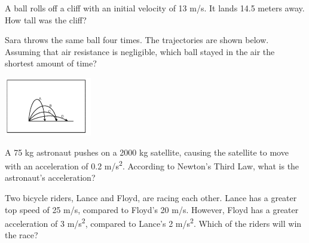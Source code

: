 \documentclass[10pt]{examdesign}
\begin{document}
\begin{multiplechoice} [title={Multiple Choice},
	rearrange=yes]
\begin{question}
\end{question}



\begin{question}
	A ball rolls off a cliff with an initial velocity of 13 m/s.  It lands 14.5 meters away.  How tall was the cliff?

\end{question}

\begin{question}
Sara throws the same ball four times.  The trajectories are shown below. Assuming that air resistance is negligible, which ball stayed in the air the shortest amount of time? 

\includegraphics[height={1in}]{proj.png}


\end{question}



\begin{question}
	A 75 kg astronaut pushes on a 2000 kg satellite, causing the satellite to move with an acceleration of 0.2 m/s\textsuperscript{2}. According to Newton's Third Law, what is the astronaut's acceleration?

\end{question}


\begin{question}
	Two bicycle riders, Lance and Floyd, are racing each other. Lance has a greater top speed of 25 m/s, compared to Floyd's 20 m/s.  However, Floyd has a greater acceleration of 3 m/s\textsuperscript{2}, compared to Lance's 2 m/s\textsuperscript{2}.  Which of the riders will win the race?

\end{question}





\end{multiplechoice}
\end{document}

